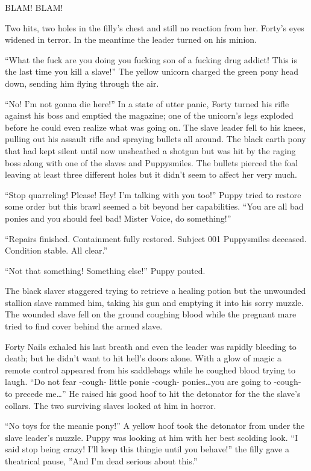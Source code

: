 BLAM! BLAM!

Two hits, two holes in the filly's chest and still no reaction from her. Forty's eyes widened in terror. In the meantime the leader turned on his minion.

``What the fuck are you doing you fucking son of a fucking drug addict! This is the last time you kill a slave!'' The yellow unicorn charged the green pony head down, sending him flying through the air.

``No! I'm not gonna die here!'' In a state of utter panic, Forty turned his rifle against his boss and emptied the magazine; one of the unicorn's legs exploded before he could even realize what was going on. The slave leader fell to his knees, pulling out his assault rifle and spraying bullets all around. The black earth pony that had kept silent until now unsheathed a shotgun but was hit by the raging boss along with one of the slaves and Puppysmiles. The bullets pierced the foal leaving at least three different holes but it didn't seem to affect her very much.

``Stop quarreling! Please! Hey! I'm talking with you too!'' Puppy tried to restore some order but this brawl seemed a bit beyond her capabilities. ``You are all bad ponies and you should feel bad! Mister Voice, do something!''

``{\mt Repairs finished. Containment fully restored. Subject 001 Puppysmiles deceased. Condition stable. All clear.}''

``Not that something! Something else!'' Puppy pouted.

The black slaver staggered trying to retrieve a healing potion but the unwounded stallion slave rammed him, taking his gun and emptying it into his sorry muzzle. The wounded slave fell on the ground coughing blood while the pregnant mare tried to find cover behind the armed slave.

Forty Nails exhaled his last breath and even the leader was rapidly bleeding to death; but he didn't want to hit hell's doors alone. With a glow of magic a remote control appeared from his saddlebags while he coughed blood trying to laugh. ``Do not fear -cough- little ponie -cough- ponies\dots you are going to -cough- to precede me\dots'' He raised his good hoof to hit the detonator for the the slave's collars. The two surviving slaves looked at him in horror.

``No toys for the meanie pony!'' A yellow hoof took the detonator from under the slave leader's muzzle. Puppy was looking at him with her best scolding look. ``I said stop being crazy! I'll keep this thingie until you behave!'' the filly gave a theatrical pause, ''And I'm dead serious about this.''

